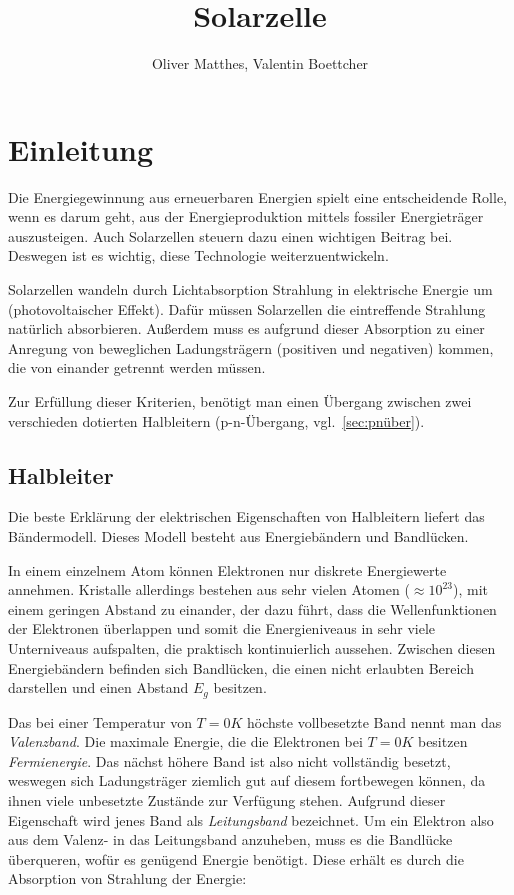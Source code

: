 \documentclass[slug=SZ, room=Hermann-Krone-Bau\,\ Labor\ 1.25,
supervisor=Martin\ Kroll, coursedate=14.\ 11.\ 2019]{../../Lab_Report_LaTeX/lab_report}
\title{Solarzelle}
\author{Oliver Matthes, Valentin Boettcher}
\begin{document}
\maketitle

\section{Einleitung}
\label{sec:einl}

Die Energiegewinnung aus erneuerbaren Energien spielt eine entscheidende Rolle, wenn es darum geht,
aus der Energieproduktion mittels fossiler Energieträger auszusteigen.
Auch Solarzellen steuern dazu einen wichtigen Beitrag bei. Deswegen ist es wichtig, diese
Technologie weiterzuentwickeln.

Solarzellen wandeln durch Lichtabsorption Strahlung in elektrische Energie um (photovoltaischer Effekt).
Dafür müssen Solarzellen die eintreffende Strahlung natürlich absorbieren.
Außerdem muss es aufgrund dieser Absorption zu einer Anregung von beweglichen Ladungsträgern
(positiven und negativen) kommen, die von einander getrennt werden müssen.

Zur Erfüllung dieser Kriterien, benötigt man einen Übergang zwischen zwei verschieden dotierten
Halbleitern (p-n-Übergang, vgl.~\ref{sec:pnüber}).

\subsection{Halbleiter}
\label{sec:halbleiter}

Die beste Erklärung der elektrischen Eigenschaften von Halbleitern liefert das Bändermodell.
Dieses Modell besteht aus Energiebändern und Bandlücken.

In einem einzelnem Atom können Elektronen nur diskrete Energiewerte annehmen.
Kristalle allerdings bestehen aus sehr vielen Atomen (\(\approx 10^{23}\)), mit einem geringen Abstand zu einander,
der dazu führt, dass die Wellenfunktionen der Elektronen überlappen und somit die Energieniveaus in sehr
viele Unterniveaus aufspalten, die praktisch kontinuierlich aussehen.
Zwischen diesen Energiebändern befinden sich Bandlücken, die einen nicht erlaubten Bereich darstellen und
einen Abstand \(E_g\) besitzen.

Das bei einer Temperatur von  \(T=0 K\)  höchste vollbesetzte Band nennt man das \emph{Valenzband}.
Die maximale Energie, die die Elektronen bei \(T=0 K\) besitzen \emph{Fermienergie}. Das nächst höhere Band ist
also nicht vollständig besetzt, weswegen sich Ladungsträger ziemlich gut auf diesem fortbewegen können, da
ihnen viele unbesetzte Zustände zur Verfügung stehen.
Aufgrund dieser Eigenschaft wird jenes Band als \emph{Leitungsband} bezeichnet.
Um ein Elektron also aus dem Valenz- in das Leitungsband anzuheben, muss es die Bandlücke überqueren,
wofür es genügend Energie benötigt. Diese erhält es durch die Absorption von Strahlung der Energie:
\end{document}
